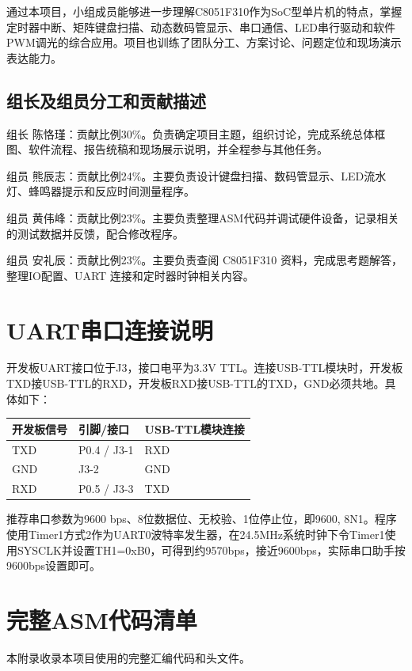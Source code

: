 ﻿\documentclass[UTF8,a4paper,12pt]{ctexart}
\begin{document}
通过本项目，小组成员能够进一步理解C8051F310作为SoC型单片机的特点，掌握定时器中断、矩阵键盘扫描、动态数码管显示、串口通信、LED串行驱动和软件PWM调光的综合应用。项目也训练了团队分工、方案讨论、问题定位和现场演示表达能力。

\subsection{组长及组员分工和贡献描述}
组长 陈恪瑾：贡献比例30\%。负责确定项目主题，组织讨论，完成系统总体框图、软件流程、报告统稿和现场展示说明，并全程参与其他任务。\par
组员 熊辰志：贡献比例24\%。主要负责设计键盘扫描、数码管显示、LED流水灯、蜂鸣器提示和反应时间测量程序。\par
组员 黄伟峰：贡献比例23\%。主要负责整理ASM代码并调试硬件设备，记录相关的测试数据并反馈，配合修改程序。\par
组员 安礼辰：贡献比例23\%。主要负责查阅 C8051F310 资料，完成思考题解答，整理IO配置、UART 连接和定时器时钟相关内容。\par

\appendix
\section{UART串口连接说明}
开发板UART接口位于J3，接口电平为3.3V TTL。连接USB-TTL模块时，开发板TXD接USB-TTL的RXD，开发板RXD接USB-TTL的TXD，GND必须共地。具体如下：

\begin{center}
\begin{tabular}{lll}
\toprule
开发板信号 & 引脚/接口 & USB-TTL模块连接 \\
\midrule
TXD & P0.4 / J3-1 & RXD \\
GND & J3-2 & GND \\
RXD & P0.5 / J3-3 & TXD \\
\bottomrule
\end{tabular}
\end{center}

推荐串口参数为9600 bps、8位数据位、无校验、1位停止位，即9600, 8N1。程序使用Timer1方式2作为UART0波特率发生器，在24.5MHz系统时钟下令Timer1使用SYSCLK并设置TH1=0xB0，可得到约9570bps，接近9600bps，实际串口助手按9600bps设置即可。

\clearpage
\section{完整ASM代码清单}
\label{app:code}
本附录收录本项目使用的完整汇编代码和头文件。
\end{document}
